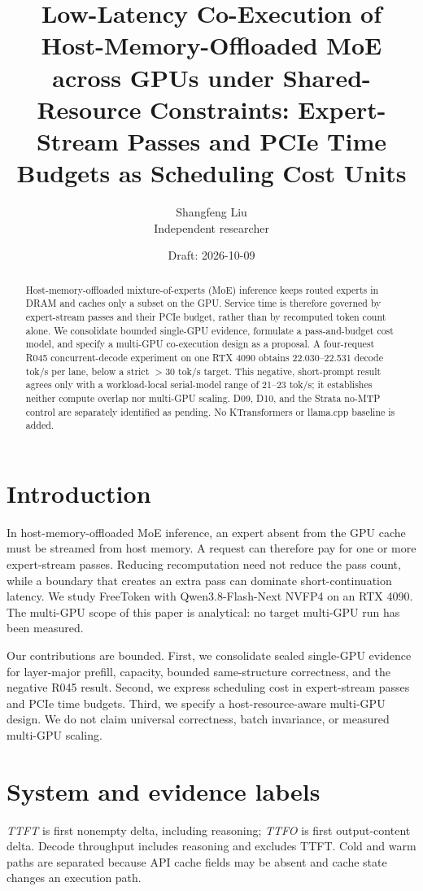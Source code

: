 \documentclass[11pt]{article}
\title{Low-Latency Co-Execution of Host-Memory-Offloaded MoE across GPUs under Shared-Resource Constraints: Expert-Stream Passes and PCIe Time Budgets as Scheduling Cost Units}
\author{Shangfeng Liu\\Independent researcher}
\date{Draft: 2026-10-09}
\begin{document}
\maketitle
\begin{abstract}
Host-memory-offloaded mixture-of-experts (MoE) inference keeps routed experts in DRAM and caches only a subset on the GPU. Service time is therefore governed by expert-stream passes and their PCIe budget, rather than by recomputed token count alone. We consolidate bounded single-GPU evidence, formulate a pass-and-budget cost model, and specify a multi-GPU co-execution design as a proposal. A four-request R045 concurrent-decode experiment on one RTX 4090 obtains 22.030--22.531 decode tok/s per lane, below a strict $>30$ tok/s target. This negative, short-prompt result agrees only with a workload-local serial-model range of 21--23 tok/s; it establishes neither compute overlap nor multi-GPU scaling. D09, D10, and the Strata no-MTP control are separately identified as pending. No KTransformers or llama.cpp baseline is added.
\end{abstract}

\section{Introduction}
In host-memory-offloaded MoE inference, an expert absent from the GPU cache must be streamed from host memory. A request can therefore pay for one or more expert-stream passes. Reducing recomputation need not reduce the pass count, while a boundary that creates an extra pass can dominate short-continuation latency. We study FreeToken with Qwen3.8-Flash-Next NVFP4 on an RTX 4090. The multi-GPU scope of this paper is analytical: no target multi-GPU run has been measured.

Our contributions are bounded. First, we consolidate sealed single-GPU evidence for layer-major prefill, capacity, bounded same-structure correctness, and the negative R045 result. Second, we express scheduling cost in expert-stream passes and PCIe time budgets. Third, we specify a host-resource-aware multi-GPU design. We do not claim universal correctness, batch invariance, or measured multi-GPU scaling.

\section{System and evidence labels}
\textit{TTFT} is first nonempty delta, including reasoning; \textit{TTFO} is first output-content delta. Decode throughput includes reasoning and excludes TTFT. Cold and warm paths are separated because API cache fields may be absent and cache state changes an execution path.
\end{document}
